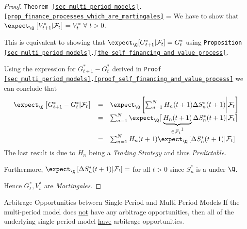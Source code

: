 \documentclass[11pt,a4paper]{article}
\begin{document}
  \begin{proof}{\texttt{Theorem \ref{sec_multi_period_models}.\ref{prop_finance_processes_which_are_martingales}}}
    \everymath={\displaystyle}
    We have to show that $\expect_\Q\left[V_{t+1}^*|\mathcal{F}_t\right]=V_t^*\ \forall\ t>0$.
    \par This is equivalent to showing that $\expect_\Q[G_{t+1}^*|\mathcal{F}_t]=G_t^*$ using \texttt{Proposition \ref{sec_multi_period_models}.\ref{the_self_financing_and_value_process}}.
    \par Using the expression for $G_{t+1}^*-G_t^*$ derived in \texttt{Proof \ref{sec_multi_period_models}.\ref{proof_self_financing_and_value_process}} we can conclude that
    \[\begin{array}{rcl}
      \expect_\Q\left[G_{t+1}^*-G_t^*|\mathcal{F}_t\right]&=&\expect_\Q\left[\sum_{n=1}^NH_n(t+1)\Delta S_n^*(t+1)\bigg|\mathcal{F}_t\right]\\
      &=&\sum_{n=1}^N\expect_\Q\big[\underbrace{H_n(t+1)}_{\in\mathcal{F}_t\footnotemark}\Delta S_n^*(t+1)|\mathcal{F}_t\big]\\
      &=&\sum_{n=1}^NH_n(t+1)\expect_\Q\left[\Delta S_n^*(t+1)|\mathcal{F}_t\right]
    \end{array}\]
    The last result is due to $H_n$ being a \textit{Trading Strategy} and thus \textit{Predictable}.
    \par Furthermore, $\expect_\Q\left[\Delta S_n^*(t+1)|\mathcal{F}_t\right]=$ for all $t>0$ since $S_n^*$ is a under $\Q$.
    \par Hence $G_t^*,V_t^*$ are \textit{Martingales}.\proved
  \end{proof}

  \begin{proposition}{Arbitrage Opportunities between Single-Period and Multi-Period Models}\label{prop_arbitrage_opportunities_single_and_multi_period_model}
    If the multi-period model does \underline{not} have any arbitrage opportunities, then all of the underlying single period model \underline{have} arbitrage opportunities.
  \end{proposition}
\end{document}
